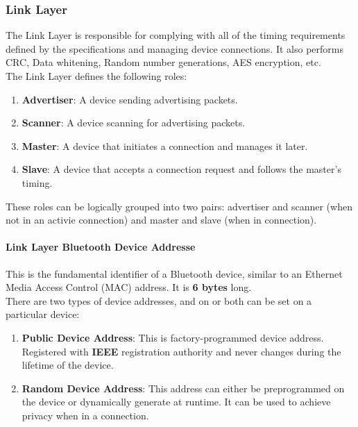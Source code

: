 \subsubsection{Link Layer}
The Link Layer is responsible for complying with all of the timing requirements defined by the specifications and managing device connections. It also performs CRC, Data whitening, Random number generations, AES encryption, etc.\\
The Link Layer defines the following roles:
\begin{enumerate}
	\item \textbf {Advertiser}: A device sending advertising packets.
	\item \textbf {Scanner}: A device scanning for advertising packets.
	\item \textbf {Master}: A device that initiates a connection and manages it later.
	\item \textbf {Slave}: A device that accepts a connection request and follows the master’s timing.
\end{enumerate}
These roles can be logically grouped into two pairs: advertiser and scanner (when not in an activie connection) and master and slave (when in connection).
\paragraph{Link Layer Bluetooth Device Addresse}
This is the fundamental identifier of a Bluetooth device, similar to an Ethernet Media Access Control (MAC) address. It is \textbf{ 6 bytes} long. \\
There are two types of device addresses, and on or both can be set on a particular device:
\begin{enumerate}
	\item \textbf{Public Device Address}: This is factory-programmed device address. Registered with \textbf{IEEE} registration authority and never changes during the lifetime of the device.
	\item \textbf{Random Device Address}: This address can either be preprogrammed on the device or dynamically generate at runtime. It can be used to achieve privacy when in a connection.
\end{enumerate}
